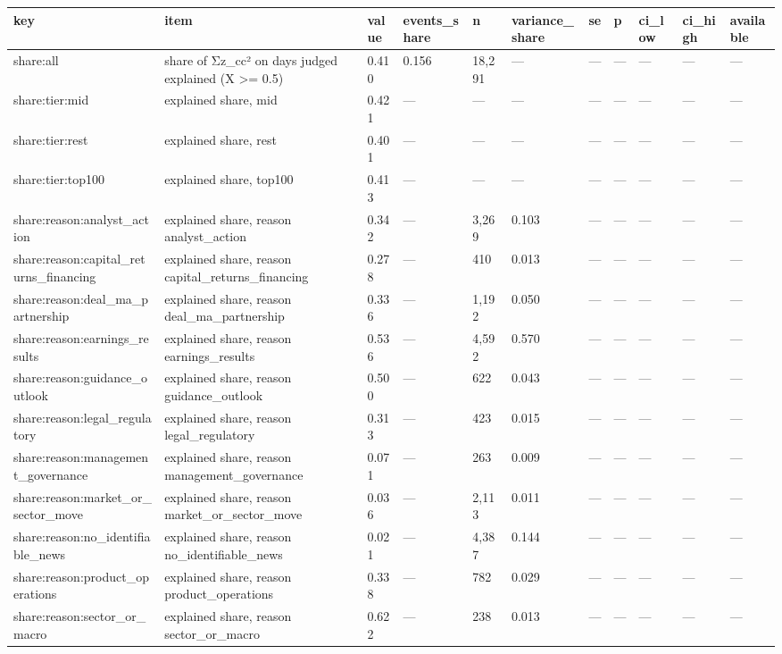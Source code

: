 \begin{tabular}{lllllllllll}
\toprule
key & item & value & events\_share & n & variance\_share & se & p & ci\_low & ci\_high & available \\
\midrule
share:all & share of Σz\_cc² on days judged explained (X >= 0.5) & 0.410 & 0.156 & 18,291 & — & — & — & — & — & — \\
share:tier:mid & explained share, mid & 0.421 & — & — & — & — & — & — & — & — \\
share:tier:rest & explained share, rest & 0.401 & — & — & — & — & — & — & — & — \\
share:tier:top100 & explained share, top100 & 0.413 & — & — & — & — & — & — & — & — \\
share:reason:analyst\_action & explained share, reason analyst\_action & 0.342 & — & 3,269 & 0.103 & — & — & — & — & — \\
share:reason:capital\_returns\_financing & explained share, reason capital\_returns\_financing & 0.278 & — & 410 & 0.013 & — & — & — & — & — \\
share:reason:deal\_ma\_partnership & explained share, reason deal\_ma\_partnership & 0.336 & — & 1,192 & 0.050 & — & — & — & — & — \\
share:reason:earnings\_results & explained share, reason earnings\_results & 0.536 & — & 4,592 & 0.570 & — & — & — & — & — \\
share:reason:guidance\_outlook & explained share, reason guidance\_outlook & 0.500 & — & 622 & 0.043 & — & — & — & — & — \\
share:reason:legal\_regulatory & explained share, reason legal\_regulatory & 0.313 & — & 423 & 0.015 & — & — & — & — & — \\
share:reason:management\_governance & explained share, reason management\_governance & 0.071 & — & 263 & 0.009 & — & — & — & — & — \\
share:reason:market\_or\_sector\_move & explained share, reason market\_or\_sector\_move & 0.036 & — & 2,113 & 0.011 & — & — & — & — & — \\
share:reason:no\_identifiable\_news & explained share, reason no\_identifiable\_news & 0.021 & — & 4,387 & 0.144 & — & — & — & — & — \\
share:reason:product\_operations & explained share, reason product\_operations & 0.338 & — & 782 & 0.029 & — & — & — & — & — \\
share:reason:sector\_or\_macro & explained share, reason sector\_or\_macro & 0.622 & — & 238 & 0.013 & — & — & — & — & — \\

\end{tabular}
